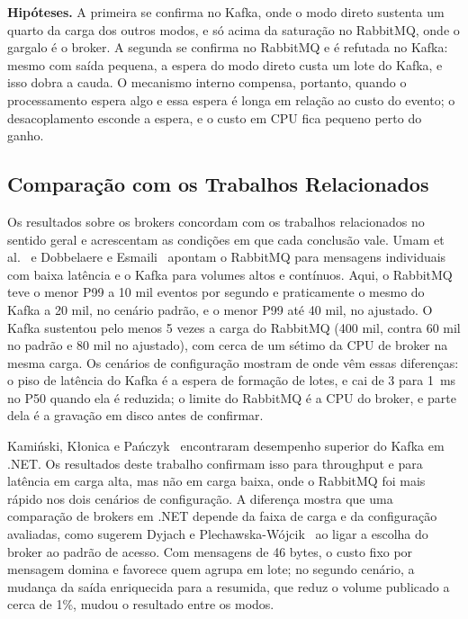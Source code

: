 \documentclass[12pt]{article}
\begin{document}
\textbf{Hipóteses.} A primeira se confirma no Kafka, onde o modo direto sustenta um
quarto da carga dos outros modos, e só acima da saturação no RabbitMQ, onde o gargalo é
o broker. A segunda se confirma no RabbitMQ e é refutada no Kafka: mesmo com saída
pequena, a espera do modo direto custa um lote do Kafka, e isso dobra a cauda. O
mecanismo interno compensa, portanto, quando o processamento espera algo e essa espera
é longa em relação ao custo do evento; o desacoplamento esconde a espera, e o custo em
CPU fica pequeno perto do ganho.

\subsection{Comparação com os Trabalhos Relacionados}
\label{sec:comparacao}

Os resultados sobre os brokers concordam com os trabalhos relacionados no sentido geral
e acrescentam as condições em que cada conclusão vale. Umam et al.~\cite{umam:2026} e
Dobbelaere e Esmaili~\cite{dobbelaere:2017} apontam o RabbitMQ para mensagens
individuais com baixa latência e o Kafka para volumes altos e contínuos. Aqui, o
RabbitMQ teve o menor P99 a 10 mil eventos por segundo e praticamente o mesmo do Kafka a
20 mil, no cenário padrão, e o menor P99 até 40 mil, no ajustado. O Kafka sustentou pelo
menos 5 vezes a carga do RabbitMQ (400 mil, contra 60 mil no padrão e 80 mil no
ajustado), com cerca de um sétimo da CPU de broker na mesma carga. Os cenários de configuração mostram de onde vêm essas
diferenças: o piso de latência do Kafka é a espera de formação de lotes, e cai de 3 para
1~ms no P50 quando ela é reduzida; o limite do RabbitMQ é a CPU do broker, e parte dela
é a gravação em disco antes de confirmar.

Kamiński, Kłonica e Pańczyk~\cite{kaminski:2025} encontraram desempenho superior do
Kafka em .NET. Os resultados deste trabalho confirmam isso para throughput e para
latência em carga alta, mas não em carga baixa, onde o RabbitMQ foi mais rápido nos dois
cenários de configuração. A diferença mostra que uma comparação de brokers em .NET
depende da faixa de carga e da configuração avaliadas, como sugerem Dyjach e
Plechawska-Wójcik~\cite{dyjach:2024} ao ligar a escolha do broker ao padrão de acesso.
Com mensagens de 46 bytes, o custo fixo por mensagem domina e favorece quem agrupa em
lote; no segundo cenário, a mudança da saída enriquecida para a resumida, que reduz o
volume publicado a cerca de 1\%, mudou o resultado entre os modos.
\end{document}
